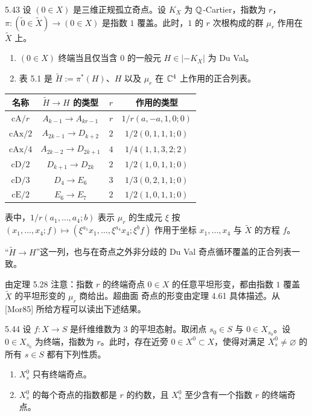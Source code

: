 \begin{theorem*}{5.43}
设 $(0\in X)$ 是三维正规孤立奇点。设 $K_X$ 为 $\mathbb{Q}$-Cartier，指数为 $r$，$\pi\colon(\tilde0\in\tilde X)\to(0\in X)$ 是指数 $1$ 覆盖。此时，$1$ 的 $r$ 次根构成的群 $\mu_r$ 作用在 $\tilde X$ 上。
\begin{enumerate}[label=(\arabic*),leftmargin=*]
\item $(0\in X)$ 终端当且仅当含 $0$ 的一般元 $H\in|-K_X|$ 为 Du Val。
\item 表 5.1 是 $\tilde H:=\pi^*(H)$、$H$ 以及 $\mu_r$ 在 $\mathbb{C}^4$ 上作用的正合列表。
\end{enumerate}
\end{theorem*}
\begin{table}[htbp]
\centering
{}
\begin{tabular}{cccc}
\toprule
名称 & $\tilde H\to H$ 的类型 & $r$ & 作用的类型 \\
\midrule
$\mathrm{cA}/r$ & $A_{k-1}\to A_{kr-1}$ & $r$ & $1/r(a,-a,1,0;0)$ \\
$\mathrm{cAx}/2$ & $A_{2k-1}\to D_{k+2}$ & $2$ & $1/2(0,1,1,1;0)$ \\
$\mathrm{cAx}/4$ & $A_{2k-2}\to D_{2k+1}$ & $4$ & $1/4(1,1,3,2;2)$ \\
$\mathrm{cD}/2$ & $D_{k+1}\to D_{2k}$ & $2$ & $1/2(1,0,1,1;0)$ \\
$\mathrm{cD}/3$ & $D_4\to E_6$ & $3$ & $1/3(0,2,1,1;0)$ \\
$\mathrm{cE}/2$ & $E_6\to E_7$ & $2$ & $1/2(1,0,1,1;0)$ \\
\bottomrule
\end{tabular}
\end{table}
表中，$1/r(a_1,\dots,a_4;b)$ 表示 $\mu_r$ 的生成元 $\xi$ 按 $(x_1,\dots,x_4;f)\mapsto(\xi^{a_1}x_1,\dots,\xi^{a_4}x_4;\xi^bf)$ 作用于坐标 $x_1,\dots,x_4$ 与 $\tilde X$ 的方程 $f$。

“$\tilde H\to H$”这一列，也与在奇点之外非分歧的 Du Val 奇点循环覆盖的正合列表一致。

由定理 5.28 注意：指数 $r$ 的终端奇点 $0\in X$ 的任意平坦形变，都由指数 $1$ 覆盖 $\tilde X$ 的平坦形变的 $\mu_r$ 商给出。超曲面
奇点的形变由定理 4.61 具体描述。从 [Mor85] 所给方程可以读出下述结果。

\begin{corollary*}{5.44}
设 $f\colon X\to S$ 是纤维维数为 $3$ 的平坦态射。取闭点 $s_0\in S$ 与 $0\in X_{s_0}$。设 $0\in X_{s_0}$ 为终端，指数为 $r$。此时，存在近旁 $0\in X^0\subset X$，使得对满足 $X^0_s\ne\varnothing$ 的所有 $s\in S$ 都有下列性质。
\begin{enumerate}[label=(\arabic*),leftmargin=*]
\item $X^0_s$ 只有终端奇点。
\item $X^0_s$ 的每个奇点的指数都是 $r$ 的约数，且 $X^0_s$ 至少含有一个指数 $r$ 的终端奇点。
\end{enumerate}
\end{corollary*}

